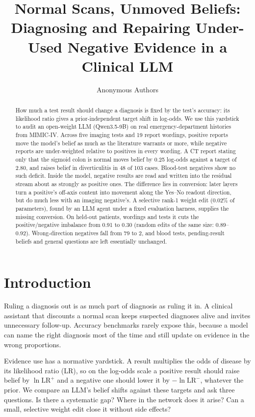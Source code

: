 \documentclass[10pt]{article}
\title{Normal Scans, Unmoved Beliefs:\\Diagnosing and Repairing Under-Used Negative Evidence in a Clinical LLM}
\author{Anonymous Authors}
\date{}
\begin{document}
\maketitle

\begin{abstract}
How much a test result should change a diagnosis is fixed by the test's accuracy: its likelihood ratio gives a prior-independent target shift in log-odds. We use this yardstick to audit an open-weight LLM (Qwen3.5-9B) on real emergency-department histories from MIMIC-IV. Across five imaging tests and 19 report wordings, positive reports move the model's belief as much as the literature warrants or more, while negative reports are under-weighted relative to positives in every wording. A CT report stating only that the sigmoid colon is normal moves belief by 0.25 log-odds against a target of 2.80, and raises belief in diverticulitis in 48 of 103 cases. Blood-test negatives show no such deficit. Inside the model, negative results are read and written into the residual stream about as strongly as positive ones. The difference lies in conversion: later layers turn a positive's off-axis content into movement along the Yes--No readout direction, but do much less with an imaging negative's. A selective rank-1 weight edit (0.02\% of parameters), found by an LLM agent under a fixed evaluation harness, supplies the missing conversion. On held-out patients, wordings and tests it cuts the positive/negative imbalance from 0.91 to 0.30 (random edits of the same size: 0.89--0.92). Wrong-direction negatives fall from 79 to 2, and blood tests, pending-result beliefs and general questions are left essentially unchanged.
\end{abstract}

\section{Introduction}

Ruling a diagnosis out is as much part of diagnosis as ruling it in. A clinical assistant that discounts a normal scan keeps suspected diagnoses alive and invites unnecessary follow-up. Accuracy benchmarks rarely expose this, because a model can name the right diagnosis most of the time and still update on evidence in the wrong proportions.

Evidence use has a normative yardstick. A result multiplies the odds of disease by its likelihood ratio (LR), so on the log-odds scale a positive result should raise belief by $\ln \mathrm{LR}^{+}$ and a negative one should lower it by $-\ln \mathrm{LR}^{-}$, whatever the prior. We compare an LLM's belief shifts against these targets and ask three questions. Is there a systematic gap? Where in the network does it arise? Can a small, selective weight edit close it without side effects?
\end{document}
